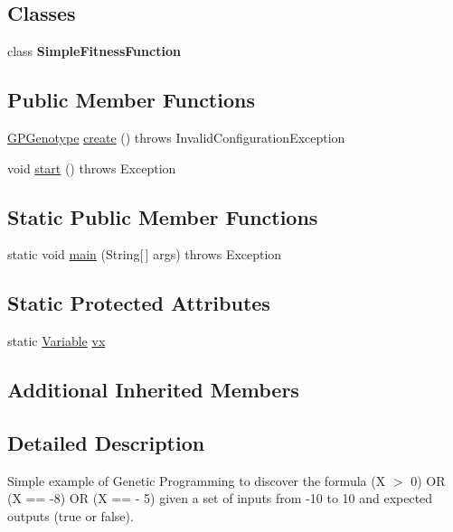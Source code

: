 \subsection*{Classes}
\begin{DoxyCompactItemize}
\item 
class {\bfseries Simple\-Fitness\-Function}
\end{DoxyCompactItemize}
\subsection*{Public Member Functions}
\begin{DoxyCompactItemize}
\item 
\hyperlink{classorg_1_1jgap_1_1gp_1_1impl_1_1_g_p_genotype}{G\-P\-Genotype} \hyperlink{classexamples_1_1gp_1_1_simple_example_a4c50d234a8d09d0de610fec3d7a59136}{create} ()  throws Invalid\-Configuration\-Exception 
\item 
void \hyperlink{classexamples_1_1gp_1_1_simple_example_ac5ede9710cc4936d29dac710dd1c49e6}{start} ()  throws Exception 
\end{DoxyCompactItemize}
\subsection*{Static Public Member Functions}
\begin{DoxyCompactItemize}
\item 
static void \hyperlink{classexamples_1_1gp_1_1_simple_example_a93a9ceef133d9a20ce91eab4ae13118c}{main} (String\mbox{[}$\,$\mbox{]} args)  throws Exception 
\end{DoxyCompactItemize}
\subsection*{Static Protected Attributes}
\begin{DoxyCompactItemize}
\item 
static \hyperlink{classorg_1_1jgap_1_1gp_1_1terminal_1_1_variable}{Variable} \hyperlink{classexamples_1_1gp_1_1_simple_example_a2885a4fcda3e2c98c6be76031aed5ce9}{vx}
\end{DoxyCompactItemize}
\subsection*{Additional Inherited Members}


\subsection{Detailed Description}
Simple example of Genetic Programming to discover the formula (X $>$ 0) O\-R (X == -\/8) O\-R (X == -\/ 5) given a set of inputs from -\/10 to 10 and expected outputs (true or false).

